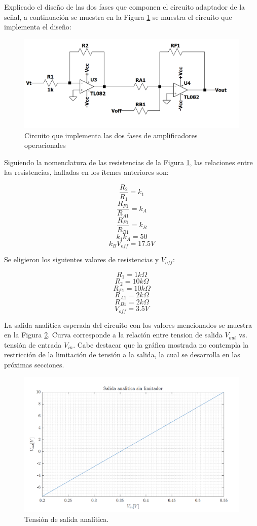 Explicado el diseño de las dos fases que componen el circuito adaptador de la señal, a continuación se muestra en la Figura \ref{6_amp_2fases} se muestra el circuito que implementa el diseño:

\begin{figure}[H]
\centering
\includegraphics[scale=0.4]{../parte6/Informe/resources/esquematico_opamps.png}
\caption{Circuito que implementa las dos fases de amplificadores operacionales}
\label{6_amp_2fases}
\end{figure}

Siguiendo la nomenclatura de las resistencias de la Figura \ref{6_amp_2fases}, las relaciones entre las resistencias, halladas en los ítemes anteriores son:

\[\frac{R_2}{R_1} = k_1\]
\[ \frac{R_{F1}}{R_{A1}} = k_A\]
\[ \frac{R_{F1}}{R_{B1}} = k_B\]
\[k_1 k_A = 50\]
\[k_B V_{off} = 17.5V\]

Se eligieron los siguientes valores de resistencias y $V_{off}$:

\[R_1 = 1k\Omega\]
\[R_2 = 10k\Omega\]
\[R_{F1} = 10k\Omega\]
\[R_{A1} = 2k\Omega\]
\[R_{B1} = 2k\Omega\]
\[V_{off} = 3.5V\]

La salida analítica esperada del circuito con los valores mencionados se muestra en la Figura \ref{6_analitica}. Curva corresponde a la relación entre tension de salida $V_{out}$ vs. tensión de entrada $V_{in}$. 
Cabe destacar que la gráfica mostrada no contempla la restricción de la limitación de tensión a la salida, la cual se desarrolla en las próximas secciones.

\begin{figure}[H]
\centering
\includegraphics[scale=0.6]{../parte6/Informe/resources/grafica_analitica.png}
\caption{Tensión de salida analítica.}
\label{6_analitica}
\end{figure}

